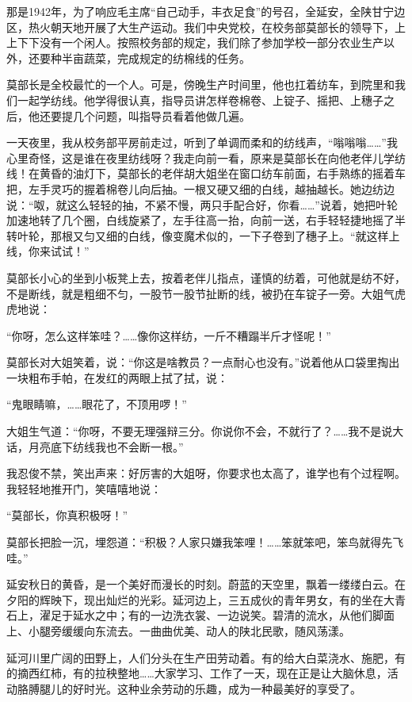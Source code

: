\documentclass[12pt,UTF-8,openany]{ctexbook}
\begin{document}
\begin{Large}
    
    那是1942年，为了响应毛主席“自己动手，丰衣足食”的号召，全延安，全陕甘宁边区，热火朝天地开展了大生产运动。我们中央党校，在校务部莫部长的领导下，上上下下没有一个闲人。按照校务部的规定，我们除了参加学校一部分农业生产以外，还要种半亩蔬菜，完成规定的纺棉线的任务。
    
    莫部长是全校最忙的一个人。可是，傍晚生产时间里，他也扛着纺车，到院里和我们一起学纺线。他学得很认真，指导员讲怎样卷棉卷、上锭子、摇把、上穗子之后，他还要提几个问题，叫指导员看着他做几遍。
    
    一天夜里，我从校务部平房前走过，听到了单调而柔和的纺线声，“嗡嗡嗡……”我心里奇怪，这是谁在夜里纺线呀？我走向前一看，原来是莫部长在向他老伴儿学纺线！在黄昏的油灯下，莫部长的老伴胡大姐坐在窗口纺车前面，右手熟练的摇着车把，左手灵巧的握着棉卷儿向后抽。一根又硬又细的白线，越抽越长。她边纺边说：“呶，就这么轻轻的抽，不紧不慢，两只手配合好，你看……”说着，她把叶轮加速地转了几个圈，白线旋紧了，左手往高一抬，向前一送，右手轻轻捷地摇了半转叶轮，那根又匀又细的白线，像变魔术似的，一下子卷到了穗子上。“就这样上线，你来试试！”
    
    莫部长小心的坐到小板凳上去，按着老伴儿指点，谨慎的纺着，可他就是纺不好，不是断线，就是粗细不匀，一股节一股节扯断的线，被扔在车锭子一旁。大姐气虎虎地说：
    
    “你呀，怎么这样笨哇？……像你这样纺，一斤不糟蹋半斤才怪呢！”
    
    莫部长对大姐笑着，说：“你这是啥教员？一点耐心也没有。”说着他从口袋里掏出一块粗布手帕，在发红的两眼上拭了拭，说：
    
    “鬼眼睛嘛，……眼花了，不顶用啰！”
    
    大姐生气道：“你呀，不要无理强辩三分。你说你不会，不就行了？……我不是说大话，月亮底下纺线我也不会断一根。”
    
    我忍俊不禁，笑出声来：好厉害的大姐呀，你要求也太高了，谁学也有个过程啊。我轻轻地推开门，笑嘻嘻地说：
    
    “莫部长，你真积极呀！”
    
    莫部长把脸一沉，埋怨道：“积极？人家只嫌我笨哩！……笨就笨吧，笨鸟就得先飞哇。”
    
    延安秋日的黄昏，是一个美好而漫长的时刻。蔚蓝的天空里，飘着一缕缕白云。在夕阳的辉映下，现出灿烂的光彩。延河边上，三五成伙的青年男女，有的坐在大青石上，濯足于延水之中；有的一边洗衣裳、一边说笑。碧清的流水，从他们脚面上、小腿旁缓缓向东流去。一曲曲优美、动人的陕北民歌，随风荡漾。
    
    延河川里广阔的田野上，人们分头在生产田劳动着。有的给大白菜浇水、施肥，有的摘西红柿，有的拉秧整地……大家学习、工作了一天，现在正是让大脑休息，活动胳膊腿儿的好时光。这种业余劳动的乐趣，成为一种最美好的享受了。
    

\end{Large}
\end{document}
